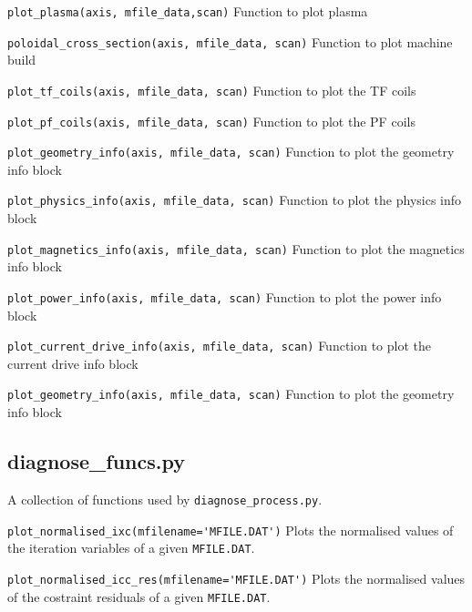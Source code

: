 \documentclass[11pt,a4paper]{article}
\newcommand{\mfile}{\mbox{\texttt{MFILE.DAT}}}
\begin{document}
\begin{description}

\item{\verb|plot_plasma(axis, mfile_data,scan)|} Function to plot plasma

\item{\verb|poloidal_cross_section(axis, mfile_data, scan)|} Function to plot machine build

\item{\verb|plot_tf_coils(axis, mfile_data, scan)|} Function to plot the TF coils

\item{\verb|plot_pf_coils(axis, mfile_data, scan)|} Function to plot the PF coils

\item{\verb|plot_geometry_info(axis, mfile_data, scan)|} Function to plot the
  geometry info block

\item{\verb|plot_physics_info(axis, mfile_data, scan)|} Function to plot the
  physics info block

\item{\verb|plot_magnetics_info(axis, mfile_data, scan)|} Function to plot the
  magnetics info block

\item{\verb|plot_power_info(axis, mfile_data, scan)|} Function to plot the
  power info block

\item{\verb|plot_current_drive_info(axis, mfile_data, scan)|} Function to plot
  the current drive info block

\item{\verb|plot_geometry_info(axis, mfile_data, scan)|} Function to plot the
  geometry info block

\end{description}


\subsection{diagnose\_funcs.py}

A collection of functions used by \texttt{diagnose\_process.py}.

\begin{description}

\item{\verb|plot_normalised_ixc(mfilename='MFILE.DAT')|} Plots the normalised values of the iteration variables of a given \mfile.

\item{\verb|plot_normalised_icc_res(mfilename='MFILE.DAT')|} Plots the normalised values of the costraint residuals of a given \mfile.

\end{description}
\end{document}
